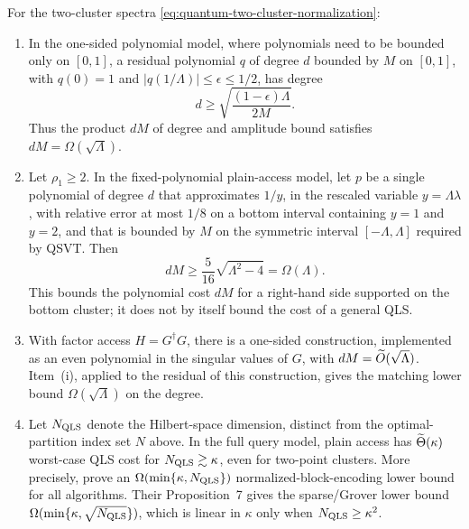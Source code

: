 \begin{theorem}
\label{thm:quantum-cluster-obstruction}
For the two-cluster spectra \eqref{eq:quantum-two-cluster-normalization}:
\begin{enumerate}[label=\textup{(\roman*)}]
 \item In the one-sided polynomial model, where polynomials need to be bounded
 only on $[0,1]$, a residual polynomial $q$ of degree $d$ bounded by
 $M$ on $[0,1]$, with $q(0)=1$ and
 $|q(1/\Lambda)|\leq\epsilon\leq1/2$, has degree
 \begin{equation}
  d\geq\sqrt{\frac{(1-\epsilon)\Lambda}{2M}}.
  \label{eq:markov-one-sided-no-go}
 \end{equation}
 Thus the product $dM$ of degree and amplitude bound satisfies
 $dM=\Omega(\sqrt\Lambda)$.
 \item Let $\rho_1\geq2$.  In the fixed-polynomial plain-access model, let
 $p$ be a single polynomial of degree $d$ that approximates $1/y$, in the
 rescaled variable $y=\Lambda\lambda$, with relative error at most $1/8$ on a
 bottom interval containing $y=1$ and $y=2$, and that is bounded by $M$ on the
 symmetric interval $[-\Lambda,\Lambda]$ required by QSVT.  Then
 \begin{equation}
  dM\geq\frac5{16}\sqrt{\Lambda^2-4}=\Omega(\Lambda).
  \label{eq:symmetric-bernstein-no-go}
 \end{equation}
 This bounds the polynomial cost $dM$ for a right-hand side supported on
 the bottom cluster; it does not by itself bound the cost of a general QLS.
 \item With factor access $H=G^\dagger G$, there is a one-sided
 construction, implemented as an even polynomial in the singular values of
 $G$, with $dM=\widetilde{O}(\sqrt\Lambda)$.  Item~\textup{(i)}, applied to the
 residual of this construction, gives the matching lower bound
 $\Omega(\sqrt\Lambda)$ on the degree.
 \item Let $N_{\rm QLS}$ denote the Hilbert-space dimension, distinct from
 the optimal-partition index set $N$ above.  In the full query model,
 plain access has $\widetilde{\Theta}(\kappa)$ worst-case QLS cost for
 $N_{\rm QLS}\gtrsim\kappa$, even for two-point clusters.  More precisely,
 \citet[Proposition~6]{orsucci2021-on-solving-classes-of-positive} prove an
 $\Omega(\min\{\kappa,N_{\rm QLS}\})$ normalized-block-encoding lower bound
 for all algorithms.  Their Proposition~7 gives the sparse/Grover lower
 bound $\Omega(\min\{\kappa,\sqrt{N_{\rm QLS}}\})$, which is linear in
 $\kappa$ only when $N_{\rm QLS}\geq\kappa^2$.
\end{enumerate}
\end{theorem}

